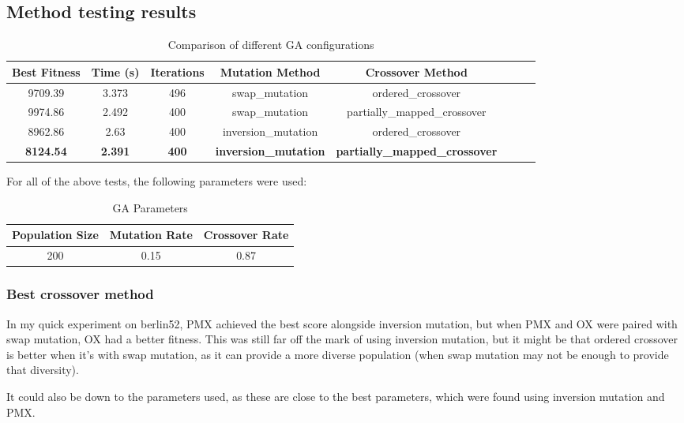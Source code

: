 \documentclass[11pt]{scrartcl} %
\begin{document}
\subsection{Method testing results}
\begin{table}[h!]
	\centering
	\begin{tabular}{|c|c|c|c|c|c|c|c|}
	\hline
	\textbf{Best Fitness} & \textbf{Time (s)} & \textbf{Iterations} & \textbf{Mutation Method} & \textbf{Crossover Method} \\ \hline
	9709.39 & 3.373 & 496 & swap\_mutation & ordered\_crossover \\ \hline
	9974.86 & 2.492 & 400 & swap\_mutation & partially\_mapped\_crossover \\ \hline
	8962.86 & 2.63 & 400 & inversion\_mutation & ordered\_crossover \\ \hline
	\textbf{8124.54} & \textbf{2.391} & \textbf{400} & \textbf{inversion\_mutation} & \textbf{partially\_mapped\_crossover} \\ \hline
	\end{tabular}
	\caption{Comparison of different GA configurations}
	\label{tab:method_testing_results}
\end{table}

For all of the above tests, the following parameters were used:
\begin{table}[h!]
	\centering
	\begin{tabular}{|c|c|c|}
	\hline
	\textbf{Population Size} & \textbf{Mutation Rate} & \textbf{Crossover Rate} \\ \hline
	200 & 0.15 & 0.87 \\ \hline
	\end{tabular}
	\caption{GA Parameters}
	\label{tab:params}
\end{table}

\subsubsection{Best crossover method}
In my quick experiment on berlin52, PMX achieved the best score alongside inversion mutation, but when PMX and OX were paired with swap mutation, OX had a better fitness. 
This was still far off the mark of using inversion mutation, but it might be that ordered crossover is better when it's with swap mutation, 
as it can provide a more diverse population (when swap mutation may not be enough to provide that diversity).

It could also be down to the parameters used, as these are close to the best parameters, which were found using inversion mutation and PMX.
\end{document}
